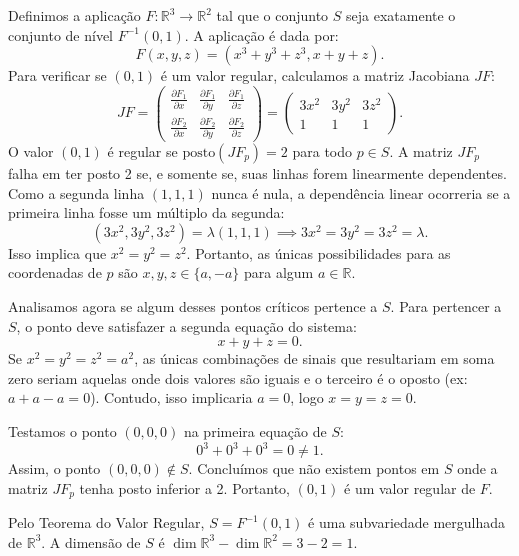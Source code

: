 {	Definimos a aplicação $F : \mathbb{R}^3 \to \mathbb{R}^2$ tal que o conjunto $S$ seja exatamente o conjunto de nível $F^{-1}(0,1)$. A aplicação é dada por:
	\begin{equation*}
		F(x,y,z) = (x^3 + y^3 + z^3, x + y + z).
	\end{equation*}
	Para verificar se $(0,1)$ é um valor regular, calculamos a matriz Jacobiana $JF$:
	\begin{equation*}
		JF = \begin{pmatrix} 
			\tfrac{\partial F_1}{\partial x} & \tfrac{\partial F_1}{\partial y} & \tfrac{\partial F_1}{\partial z} \\ 
			\tfrac{\partial F_2}{\partial x} & \tfrac{\partial F_2}{\partial y} & \tfrac{\partial F_2}{\partial z} 
		\end{pmatrix} = 
		\begin{pmatrix} 
			3x^2 & 3y^2 & 3z^2 \\ 
			1 & 1 & 1 
		\end{pmatrix}.
	\end{equation*}
	O valor $(0,1)$ é regular se $\text{posto}(JF_p) = 2$ para todo $p \in S$. A matriz $JF_p$ falha em ter posto 2 se, e somente se, suas linhas forem linearmente dependentes. Como a segunda linha $(1,1,1)$ nunca é nula, a dependência linear ocorreria se a primeira linha fosse um múltiplo da segunda:
	\begin{equation*}
		(3x^2, 3y^2, 3z^2) = \lambda(1, 1, 1) \implies 3x^2 = 3y^2 = 3z^2 = \lambda.
	\end{equation*}
	Isso implica que $x^2 = y^2 = z^2$. Portanto, as únicas possibilidades para as coordenadas de $p$ são $x,y,z \in \{ a, -a \}$ para algum $a \in \mathbb{R}$. 
	
	Analisamos agora se algum desses pontos críticos pertence a $S$. Para pertencer a $S$, o ponto deve satisfazer a segunda equação do sistema:
	\begin{equation*}
		x + y + z = 0.
	\end{equation*}
	Se $x^2 = y^2 = z^2 = a^2$, as únicas combinações de sinais que resultariam em soma zero seriam aquelas onde dois valores são iguais e o terceiro é o oposto (ex: $a + a - a = 0$). Contudo, isso implicaria $a = 0$, logo $x=y=z=0$. 
	
	Testamos o ponto $(0,0,0)$ na primeira equação de $S$:
	\begin{equation*}
		0^3 + 0^3 + 0^3 = 0 \neq 1.
	\end{equation*}
	Assim, o ponto $(0,0,0) \notin S$. Concluímos que não existem pontos em $S$ onde a matriz $JF_p$ tenha posto inferior a 2. Portanto, $(0,1)$ é um valor regular de $F$.
	
	Pelo Teorema do Valor Regular, $S = F^{-1}(0,1)$ é uma subvariedade mergulhada de $\mathbb{R}^3$. A dimensão de $S$ é $\dim \mathbb{R}^3 - \dim \mathbb{R}^2 = 3 - 2 = 1$.
}

